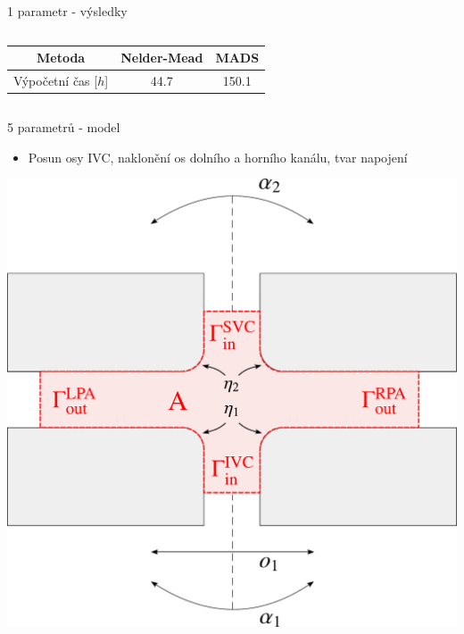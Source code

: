 \documentclass[aspectratio=169,xcolor=dvipsnames]{beamer}
\begin{document}
\begin{frame}{1 parametr - výsledky}
\begin{columns}
\begin{column}{.5\textwidth}
			\bgroup
			\tiny
			\centering
			\setlength\tabcolsep{5mm}
			\def\arraystretch{1.3}%
			\begin{tabular}{|c|c|c|}
				\hline
				Metoda & Nelder-Mead & MADS \\ \hline
				Výpočetní čas [$h$] & 44.7 & 150.1 \\ \hline
			\end{tabular}
			\egroup	
		\end{column}
	\end{columns}
\end{frame}
\begin{frame}{5 parametrů - model}
	
	\addtocounter{framenumber}{-1}
	\begin{itemize}
		\item Posun osy IVC, naklonění os dolního a horního kanálu, tvar napojení
	\end{itemize}
	\begin{center}
		\includegraphics[width=0.45\linewidth, trim={0 0 0 0}, clip]{Images/model2.pdf}
	\end{center}
\end{frame}
\end{document}
